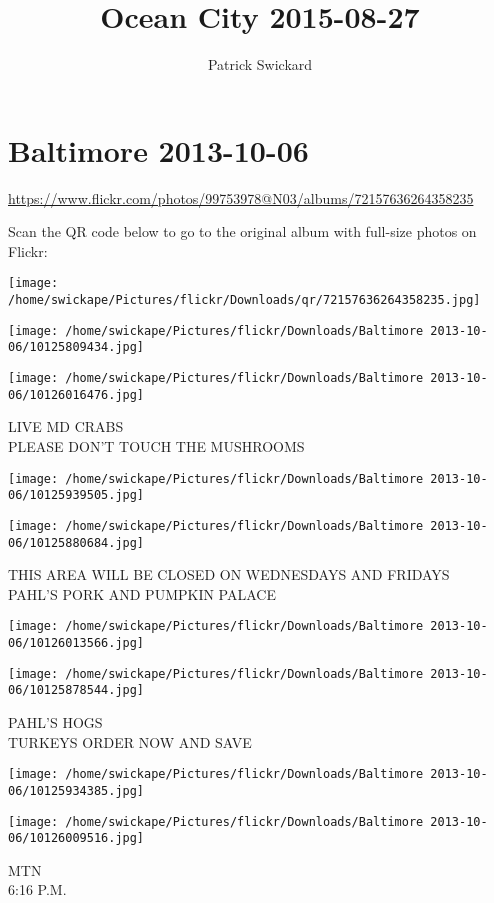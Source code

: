\documentclass[10pt,letterpaper]{article}
\title{Ocean City 2015-08-27}
\author{Patrick Swickard}
\date{}
\begin{document}
\section*{Baltimore 2013-10-06}

\url{https://www.flickr.com/photos/99753978@N03/albums/72157636264358235}

Scan the QR code below to go to the original album with full-size photos on Flickr:

\texttt{[image: /home/swickape/Pictures/flickr/Downloads/qr/72157636264358235.jpg]}
\pagebreak

\texttt{[image: /home/swickape/Pictures/flickr/Downloads/Baltimore 2013-10-06/10125809434.jpg]}

\vspace{0.25in}
\texttt{[image: /home/swickape/Pictures/flickr/Downloads/Baltimore 2013-10-06/10126016476.jpg]}

LIVE MD CRABS\\
PLEASE DON'T TOUCH THE MUSHROOMS
\pagebreak

\texttt{[image: /home/swickape/Pictures/flickr/Downloads/Baltimore 2013-10-06/10125939505.jpg]}

\vspace{0.25in}
\texttt{[image: /home/swickape/Pictures/flickr/Downloads/Baltimore 2013-10-06/10125880684.jpg]}

THIS AREA WILL BE CLOSED ON WEDNESDAYS AND FRIDAYS\\
PAHL'S PORK AND PUMPKIN PALACE
\pagebreak

\texttt{[image: /home/swickape/Pictures/flickr/Downloads/Baltimore 2013-10-06/10126013566.jpg]}

\vspace{0.25in}
\texttt{[image: /home/swickape/Pictures/flickr/Downloads/Baltimore 2013-10-06/10125878544.jpg]}

PAHL'S HOGS\\
TURKEYS ORDER NOW AND SAVE
\pagebreak

\texttt{[image: /home/swickape/Pictures/flickr/Downloads/Baltimore 2013-10-06/10125934385.jpg]}

\vspace{0.25in}
\texttt{[image: /home/swickape/Pictures/flickr/Downloads/Baltimore 2013-10-06/10126009516.jpg]}

MTN\\
6:16 P.M.
\pagebreak
\end{document}
